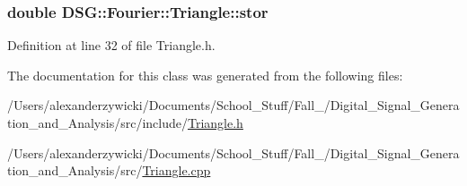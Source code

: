 \hypertarget{classDSG_1_1Fourier_1_1Triangle_ae841650a157ead082b83c3cf1154a2f0}{
\subsubsection[{stor}]{\setlength{\rightskip}{0pt plus 5cm}double D\-S\-G\-::\-Fourier\-::\-Triangle\-::stor\hspace{0.3cm}{\ttfamily [protected]}}}\label{classDSG_1_1Fourier_1_1Triangle_ae841650a157ead082b83c3cf1154a2f0}


Definition at line 32 of file Triangle.\-h.



The documentation for this class was generated from the following files\-:\begin{DoxyCompactItemize}
\item 
/\-Users/alexanderzywicki/\-Documents/\-School\-\_\-\-Stuff/\-Fall\-\_/\-Digital\-\_\-\-Signal\-\_\-\-Generation\-\_\-and\-\_\-\-Analysis/src/include/\hyperlink{Triangle_8h}{Triangle.\-h}\item 
/\-Users/alexanderzywicki/\-Documents/\-School\-\_\-\-Stuff/\-Fall\-\_/\-Digital\-\_\-\-Signal\-\_\-\-Generation\-\_\-and\-\_\-\-Analysis/src/\hyperlink{Triangle_8cpp}{Triangle.\-cpp}\end{DoxyCompactItemize}

